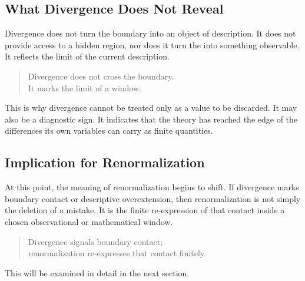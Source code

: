 \subsection*{What Divergence Does Not Reveal}

Divergence does not turn the boundary into an object of description.
It does not provide access to a hidden region,
nor does it turn the \ungenerated{} into something observable.
It reflects the limit of the current description.

\medskip
\begin{quote}
Divergence does not cross the boundary.\\
It marks the limit of a window.
\end{quote}
\medskip

This is why divergence cannot be treated only as a value to be
discarded.
It may also be a diagnostic sign.
It indicates that the theory has reached the edge of the differences
its own variables can carry as finite quantities.

\subsection*{Implication for Renormalization}

At this point,
the meaning of renormalization begins to shift.
If divergence marks boundary contact or descriptive overextension,
then renormalization is not simply the deletion of a mistake.
It is the finite re-expression of that contact inside a chosen
observational or mathematical window.

\medskip
\begin{quote}
Divergence signals boundary contact;\\
renormalization re-expresses that contact finitely.
\end{quote}
\medskip

This will be examined in detail in the next section.
